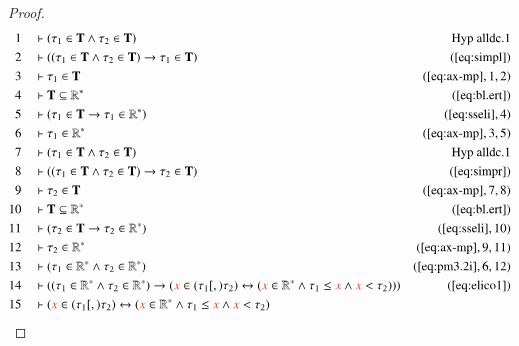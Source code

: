\begin{proof}\label{proof:bl.alldc}
\begin{align}
  1 &&  & \vdash ( \tau_1 \in \mathbf{T} \wedge \tau_2 \in \mathbf{T}
      )&\text{Hyp~alldc.1}\notag%
  \\ 2 &&  & \vdash ( ( \tau_1 \in \mathbf{T} \wedge \tau_2 \in \mathbf{T} )
      \rightarrow \tau_1 \in \mathbf{T}
      )&(\mbox{\ref{eq:simpl}})\notag
  \\ 3 &&  & \vdash \tau_1 \in \mathbf{T}&(\mbox{\ref{eq:ax-mp}},1,2)\notag
  \\ 4 &&  & \vdash \mathbf{T} \subseteq
      \mathbb{R}^{\ast}&(\mbox{\ref{eq:bl.ert}})\notag
  \\ 5 &&  & \vdash ( \tau_1 \in \mathbf{T} \rightarrow \tau_1 \in
      \mathbb{R}^{\ast} )&(\mbox{\ref{eq:sseli}},4)\notag
  \\ 6 &&  & \vdash \tau_1 \in \mathbb{R}^{\ast}&(\mbox{\ref{eq:ax-mp}},3,5)\notag
  \\ 7 &&  & \vdash ( \tau_1 \in \mathbf{T} \wedge \tau_2 \in \mathbf{T}
      )&\text{Hyp~alldc.1}\notag%
  \\ 8 &&  & \vdash ( ( \tau_1 \in \mathbf{T} \wedge \tau_2 \in \mathbf{T} )
      \rightarrow \tau_2 \in \mathbf{T}
      )&(\mbox{\ref{eq:simpr}})\notag
  \\ 9 &&  & \vdash \tau_2 \in \mathbf{T}&(\mbox{\ref{eq:ax-mp}},7,8)\notag
  \\ 10 &&  & \vdash \mathbf{T} \subseteq
      \mathbb{R}^{\ast}&(\mbox{\ref{eq:bl.ert}})\notag
  \\ 11 &&  & \vdash ( \tau_2 \in \mathbf{T} \rightarrow \tau_2 \in
      \mathbb{R}^{\ast} )&(\mbox{\ref{eq:sseli}},10)\notag
  \\ 12 &&  & \vdash \tau_2 \in
      \mathbb{R}^{\ast}&(\mbox{\ref{eq:ax-mp}},9,11)\notag
  \\ 13 &&  & \vdash ( \tau_1 \in \mathbb{R}^{\ast} \wedge \tau_2 \in
      \mathbb{R}^{\ast} )&(\mbox{\ref{eq:pm3.2i}},6,12)\notag
  \\ 14 &&  & \vdash ( ( \tau_1 \in \mathbb{R}^{\ast} \wedge \tau_2 \in
      \mathbb{R}^{\ast} ) \rightarrow ( \msc{x} \in ( \tau_1
      [,) \tau_2 ) \leftrightarrow ( \msc{x} \in
      \mathbb{R}^{\ast} \wedge \tau_1 \le \msc{x} \wedge
      \msc{x} < \tau_2 ) ) )&(\mbox{\ref{eq:elico1}})\notag
  \\ 15 &&  & \vdash ( \msc{x} \in ( \tau_1 [,) \tau_2 ) \leftrightarrow (
      \msc{x} \in \mathbb{R}^{\ast} \wedge \tau_1 \le \msc{x}
      \wedge \msc{x} < \tau_2 )

\end{align}
\end{proof}
